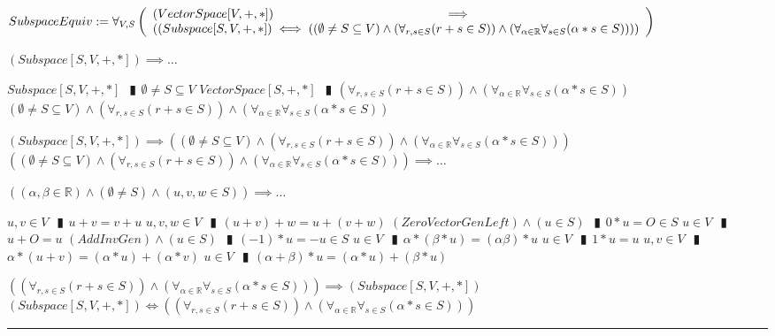 \documentclass{book}
\newcommand{\abr}{:=}
\newcommand{\pipe}{$\phantom{(}\vrectangleblack\phantom{)}$}
\newcommand{\pr}[1]{\left(#1\right)}
\begin{document}
$SubspaceEquiv \abr \forall_{V, S}\left(\begin{array}{ll}
  (VectorSpace[V, +, *]) \hfill \implies \hfill \\
  \pr{(Subspace[S, V, +, *]) \iff \pr{(\emptyset \neq S \subseteq V) \land \pr{\forall_{r, s \in S}(r + s \in S)} \land \pr{\forall_{\alpha \in \mathbb{R}} \forall_{s \in S}(\alpha * s \in S)}}}
\end{array}\right)$
\begin{enumerate}
  \lit $(Subspace[S, V, +, *]) \implies \ldots$
  \begin{enumerate}
    \lit $Subspace[S, V, +, *]$ \pipe $\emptyset \neq S \subseteq V$
    \lit $VectorSpace[S, +, *]$ \pipe $\pr{\forall_{r, s \in S}(r + s \in S)} \land \pr{\forall_{\alpha \in \mathbb{R}} \forall_{s \in S}(\alpha * s \in S)}$
    \lit $(\emptyset \neq S \subseteq V) \land \pr{\forall_{r, s \in S}(r + s \in S)} \land \pr{\forall_{\alpha \in \mathbb{R}} \forall_{s \in S}(\alpha * s \in S)}$
  \end{enumerate}
  \lit $(Subspace[S, V, +, *]) \implies \pr{(\emptyset \neq S \subseteq V) \land \pr{\forall_{r, s \in S}(r + s \in S)} \land \pr{\forall_{\alpha \in \mathbb{R}} \forall_{s \in S}(\alpha * s \in S)}}$
  \lit $\pr{(\emptyset \neq S \subseteq V) \land \pr{\forall_{r, s \in S}(r + s \in S)} \land \pr{\forall_{\alpha \in \mathbb{R}} \forall_{s \in S}(\alpha * s \in S)}} \implies \ldots$
  \begin{enumerate}
    \lit $\pr{(\alpha, \beta \in \mathbb{R}) \land (\emptyset \neq S) \land (u, v, w \in S)} \implies \ldots$
    \begin{enumerate}
      \lit $u, v \in V$ \pipe $u + v = v + u$
      \lit $u, v, w \in V$ \pipe $(u + v) + w = u + (v + w)$
      \lit $(ZeroVectorGenLeft) \land (u \in S)$ \pipe $0 * u = O \in S$
      \lit $u \in V$ \pipe $u + O = u$
      \lit $(AddInvGen) \land (u \in S)$ \pipe $(-1) * u = -u \in S$
      \lit $u \in V$ \pipe $\alpha * (\beta * u) = (\alpha \beta) * u$
      \lit $u \in V$ \pipe $1 * u = u$
      \lit $u, v \in V$ \pipe $\alpha * (u + v) = (\alpha * u) + (\alpha * v)$
      \lit $u \in V$ \pipe $(\alpha + \beta) * u = (\alpha * u) + (\beta * u)$
    \end{enumerate}
  \end{enumerate}
  \lit $\pr{\pr{\forall_{r, s \in S}(r + s \in S)} \land \pr{\forall_{\alpha \in \mathbb{R}} \forall_{s \in S}(\alpha * s \in S)}} \implies (Subspace[S, V, +, *])$
  \lit $(Subspace[S, V, +, *]) \iff \pr{\pr{\forall_{r, s \in S}(r + s \in S)} \land \pr{\forall_{\alpha \in \mathbb{R}} \forall_{s \in S}(\alpha * s \in S)}}$
\end{enumerate} \vspace{.75mm} \hrule \vspace{.75mm} \ \\ 
\end{document}
